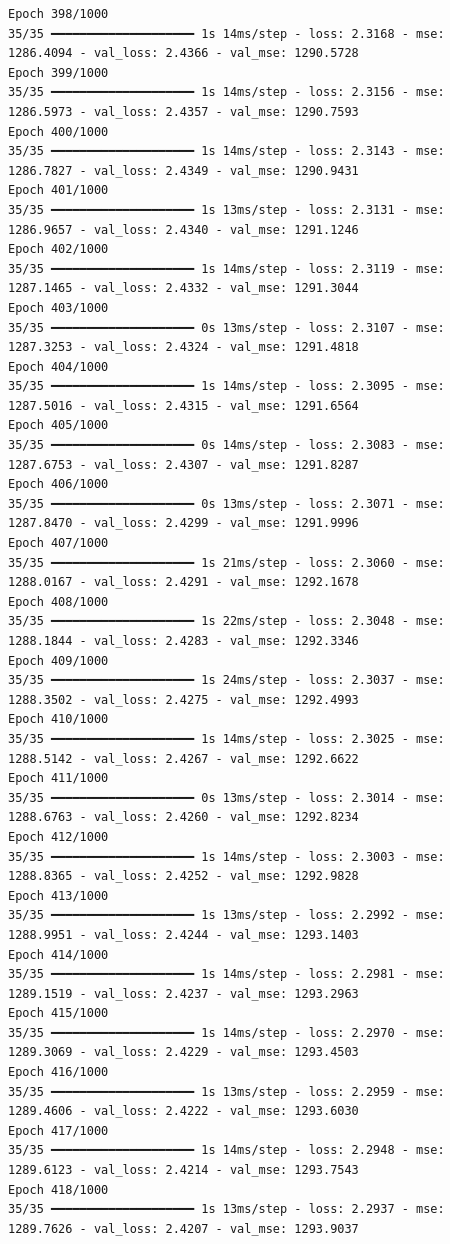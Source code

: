 \documentclass[
  letterpaper,
  DIV=11,
  numbers=noendperiod]{scrreprt}
\begin{document}
\begin{verbatim}
Epoch 398/1000
35/35 ━━━━━━━━━━━━━━━━━━━━ 1s 14ms/step - loss: 2.3168 - mse: 1286.4094 - val_loss: 2.4366 - val_mse: 1290.5728
Epoch 399/1000
35/35 ━━━━━━━━━━━━━━━━━━━━ 1s 14ms/step - loss: 2.3156 - mse: 1286.5973 - val_loss: 2.4357 - val_mse: 1290.7593
Epoch 400/1000
35/35 ━━━━━━━━━━━━━━━━━━━━ 1s 14ms/step - loss: 2.3143 - mse: 1286.7827 - val_loss: 2.4349 - val_mse: 1290.9431
Epoch 401/1000
35/35 ━━━━━━━━━━━━━━━━━━━━ 1s 13ms/step - loss: 2.3131 - mse: 1286.9657 - val_loss: 2.4340 - val_mse: 1291.1246
Epoch 402/1000
35/35 ━━━━━━━━━━━━━━━━━━━━ 1s 14ms/step - loss: 2.3119 - mse: 1287.1465 - val_loss: 2.4332 - val_mse: 1291.3044
Epoch 403/1000
35/35 ━━━━━━━━━━━━━━━━━━━━ 0s 13ms/step - loss: 2.3107 - mse: 1287.3253 - val_loss: 2.4324 - val_mse: 1291.4818
Epoch 404/1000
35/35 ━━━━━━━━━━━━━━━━━━━━ 1s 14ms/step - loss: 2.3095 - mse: 1287.5016 - val_loss: 2.4315 - val_mse: 1291.6564
Epoch 405/1000
35/35 ━━━━━━━━━━━━━━━━━━━━ 0s 14ms/step - loss: 2.3083 - mse: 1287.6753 - val_loss: 2.4307 - val_mse: 1291.8287
Epoch 406/1000
35/35 ━━━━━━━━━━━━━━━━━━━━ 0s 13ms/step - loss: 2.3071 - mse: 1287.8470 - val_loss: 2.4299 - val_mse: 1291.9996
Epoch 407/1000
35/35 ━━━━━━━━━━━━━━━━━━━━ 1s 21ms/step - loss: 2.3060 - mse: 1288.0167 - val_loss: 2.4291 - val_mse: 1292.1678
Epoch 408/1000
35/35 ━━━━━━━━━━━━━━━━━━━━ 1s 22ms/step - loss: 2.3048 - mse: 1288.1844 - val_loss: 2.4283 - val_mse: 1292.3346
Epoch 409/1000
35/35 ━━━━━━━━━━━━━━━━━━━━ 1s 24ms/step - loss: 2.3037 - mse: 1288.3502 - val_loss: 2.4275 - val_mse: 1292.4993
Epoch 410/1000
35/35 ━━━━━━━━━━━━━━━━━━━━ 1s 14ms/step - loss: 2.3025 - mse: 1288.5142 - val_loss: 2.4267 - val_mse: 1292.6622
Epoch 411/1000
35/35 ━━━━━━━━━━━━━━━━━━━━ 0s 13ms/step - loss: 2.3014 - mse: 1288.6763 - val_loss: 2.4260 - val_mse: 1292.8234
Epoch 412/1000
35/35 ━━━━━━━━━━━━━━━━━━━━ 1s 14ms/step - loss: 2.3003 - mse: 1288.8365 - val_loss: 2.4252 - val_mse: 1292.9828
Epoch 413/1000
35/35 ━━━━━━━━━━━━━━━━━━━━ 1s 13ms/step - loss: 2.2992 - mse: 1288.9951 - val_loss: 2.4244 - val_mse: 1293.1403
Epoch 414/1000
35/35 ━━━━━━━━━━━━━━━━━━━━ 1s 14ms/step - loss: 2.2981 - mse: 1289.1519 - val_loss: 2.4237 - val_mse: 1293.2963
Epoch 415/1000
35/35 ━━━━━━━━━━━━━━━━━━━━ 1s 14ms/step - loss: 2.2970 - mse: 1289.3069 - val_loss: 2.4229 - val_mse: 1293.4503
Epoch 416/1000
35/35 ━━━━━━━━━━━━━━━━━━━━ 1s 13ms/step - loss: 2.2959 - mse: 1289.4606 - val_loss: 2.4222 - val_mse: 1293.6030
Epoch 417/1000
35/35 ━━━━━━━━━━━━━━━━━━━━ 1s 14ms/step - loss: 2.2948 - mse: 1289.6123 - val_loss: 2.4214 - val_mse: 1293.7543
Epoch 418/1000
35/35 ━━━━━━━━━━━━━━━━━━━━ 1s 13ms/step - loss: 2.2937 - mse: 1289.7626 - val_loss: 2.4207 - val_mse: 1293.9037

\end{verbatim}
\end{document}

